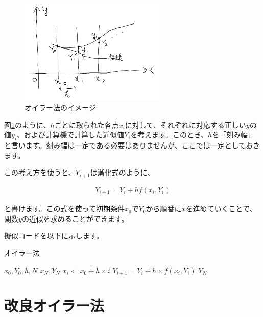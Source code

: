 \begin{figure}[ht!]
  \centering
  \includegraphics[width=7cm]{img/4-euler.png}
  \caption{オイラー法のイメージ}
  \label{fig:4-euler}
\end{figure}

図\ref{fig:4-euler}のように、$h$ごとに取られた各点$x_i$に対して、それぞれに対応する正しい$y$の値$y_i$、および計算機で計算した近似値$Y_i$を考えます。このとき、$h$を「刻み幅」と言います。刻み幅は一定である必要はありませんが、ここでは一定としておきます。

この考え方を使うと、$Y_{i+1}$は漸化式のように、

\begin{eqnarray}
    Y_{i+1}=Y_i+hf(x_i,Y_i)
\end{eqnarray}

\noindent
と書けます。この式を使って初期条件$x_0$で$Y_0$から順番に$x$を進めていくことで、関数$y$の近似を求めることができます。

擬似コードを以下に示します。

\begin{algorithm}
\caption{オイラー法}
\begin{algorithmic}
\REQUIRE $x_0,Y_0,h,N$
\ENSURE $x_N,Y_N$
    \STATE $x_i\Leftarrow x_0+h\times i$
    \STATE $Y_{i+1}=Y_i+h\times f(x_i,Y_i)$
\ENDFOR
\RETURN $Y_N$
\end{algorithmic}
\end{algorithm}







\section{改良オイラー法}
\label{adv-euler}




\clearpage